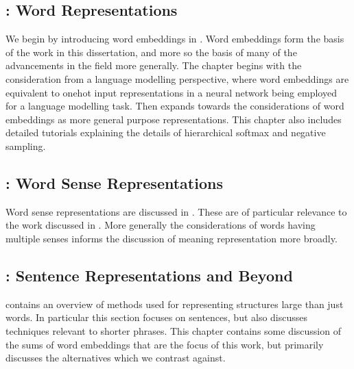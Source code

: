 \documentclass{book}
\begin{document}
\subsection*{:  Word Representations}
We begin by introducing word embeddings in .
Word embeddings form the basis of the work in this dissertation, and more so the basis of many of the advancements in the field more generally.
The chapter begins with the consideration from a language modelling perspective,
where word embeddings are equivalent to onehot input representations in a neural network being employed for a language modelling task.
Then expands towards the considerations of word embeddings as more general purpose representations.
This chapter also includes detailed tutorials explaining the details of hierarchical softmax and negative sampling.


\subsection*{:  Word Sense Representations}
Word sense representations are discussed in .
These are of particular relevance to the work discussed in .
More generally the considerations of words having multiple senses informs the discussion of meaning representation more broadly.

\subsection*{:  Sentence Representations and Beyond}
 contains an overview of methods used for representing structures large than just words.
In particular this section focuses on sentences, but also discusses techniques relevant to shorter phrases.
This chapter contains some discussion of the sums of word embeddings that are the focus of this work,
but primarily discusses the alternatives which we contrast against.
\end{document}

